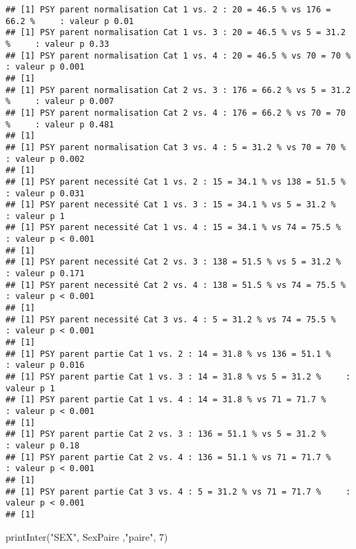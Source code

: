 \documentclass[
]{article}
\newenvironment{Shaded}{\begin{snugshade}}{\end{snugshade}}
\newcommand{\DecValTok}[1]{\textcolor[rgb]{0.00,0.00,0.81}{#1}}
\newcommand{\FunctionTok}[1]{\textcolor[rgb]{0.00,0.00,0.00}{#1}}
\newcommand{\NormalTok}[1]{#1}
\newcommand{\StringTok}[1]{\textcolor[rgb]{0.31,0.60,0.02}{#1}}
\begin{document}
\begin{verbatim}
## [1] PSY parent normalisation Cat 1 vs. 2 : 20 = 46.5 % vs 176 = 66.2 %     : valeur p 0.01
## [1] PSY parent normalisation Cat 1 vs. 3 : 20 = 46.5 % vs 5 = 31.2 %     : valeur p 0.33
## [1] PSY parent normalisation Cat 1 vs. 4 : 20 = 46.5 % vs 70 = 70 %     : valeur p 0.001
## [1] 
## [1] PSY parent normalisation Cat 2 vs. 3 : 176 = 66.2 % vs 5 = 31.2 %     : valeur p 0.007
## [1] PSY parent normalisation Cat 2 vs. 4 : 176 = 66.2 % vs 70 = 70 %     : valeur p 0.481
## [1] 
## [1] PSY parent normalisation Cat 3 vs. 4 : 5 = 31.2 % vs 70 = 70 %     : valeur p 0.002
## [1] 
## [1] PSY parent necessité Cat 1 vs. 2 : 15 = 34.1 % vs 138 = 51.5 %     : valeur p 0.031
## [1] PSY parent necessité Cat 1 vs. 3 : 15 = 34.1 % vs 5 = 31.2 %     : valeur p 1
## [1] PSY parent necessité Cat 1 vs. 4 : 15 = 34.1 % vs 74 = 75.5 %     : valeur p < 0.001
## [1] 
## [1] PSY parent necessité Cat 2 vs. 3 : 138 = 51.5 % vs 5 = 31.2 %     : valeur p 0.171
## [1] PSY parent necessité Cat 2 vs. 4 : 138 = 51.5 % vs 74 = 75.5 %     : valeur p < 0.001
## [1] 
## [1] PSY parent necessité Cat 3 vs. 4 : 5 = 31.2 % vs 74 = 75.5 %     : valeur p < 0.001
## [1] 
## [1] PSY parent partie Cat 1 vs. 2 : 14 = 31.8 % vs 136 = 51.1 %     : valeur p 0.016
## [1] PSY parent partie Cat 1 vs. 3 : 14 = 31.8 % vs 5 = 31.2 %     : valeur p 1
## [1] PSY parent partie Cat 1 vs. 4 : 14 = 31.8 % vs 71 = 71.7 %     : valeur p < 0.001
## [1] 
## [1] PSY parent partie Cat 2 vs. 3 : 136 = 51.1 % vs 5 = 31.2 %     : valeur p 0.18
## [1] PSY parent partie Cat 2 vs. 4 : 136 = 51.1 % vs 71 = 71.7 %     : valeur p < 0.001
## [1] 
## [1] PSY parent partie Cat 3 vs. 4 : 5 = 31.2 % vs 71 = 71.7 %     : valeur p < 0.001
## [1]
\end{verbatim}

\begin{Shaded}
\begin{Highlighting}[]
\FunctionTok{printInter}\NormalTok{(}\StringTok{"SEX"}\NormalTok{, SexPaire ,}\StringTok{"paire"}\NormalTok{, }\DecValTok{7}\NormalTok{)}
\end{Highlighting}
\end{Shaded}
\end{document}
